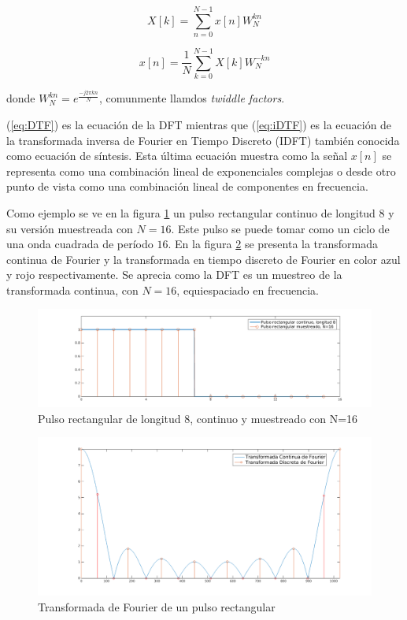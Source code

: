 \begin{equation}
X[k] = \sum_{n=0}^{N-1}x[n]W_N^{kn}
\label{eq:DTF}
\end{equation}

\begin{equation}
x[n] = \frac{1}{N}\sum_{k=0}^{N-1}X[k]W_N^{-kn}
\label{eq:iDTF}
\end{equation}

donde $W_N^{kn}=e^{\frac{-j2\pi kn}{N}}$, comunmente llamdos \textit{twiddle factors}.

(\ref{eq:DTF}) es la ecuación de la DFT mientras que (\ref{eq:iDTF}) es la ecuación de la
transformada inversa de Fourier en Tiempo Discreto (IDFT) también conocida como ecuación de síntesis. Esta última
ecuación muestra como la señal $x[n]$ se representa como una combinación lineal
de exponenciales complejas o desde otro punto de vista como una combinación
lineal de componentes en frecuencia.

Como ejemplo se ve en la figura \ref{fig:escalon_16} un pulso rectangular continuo de
longitud $8$ y su versión muestreada con $N=16$. Este pulso se puede tomar como un ciclo de una
onda cuadrada de período $16$.
En la figura \ref{fig:fourier_escalon} se presenta la transformada continua de
Fourier y la transformada en tiempo discreto de Fourier en color azul y rojo
respectivamente. Se aprecia como la DFT es un muestreo de la transformada
continua, con $N=16$, equiespaciado en frecuencia.

\begin{figure}[htb!]
        \centering
        \includegraphics[width=12cm]{./figures/pulso_rect.png}
        \caption{Pulso rectangular de longitud 8, continuo y muestreado con N=16}
        \label{fig:escalon_16}
\end{figure}

\begin{figure}[htb!]
        \centering
        \includegraphics[width=12cm]{./figures/FT_DFT.png}
        \caption{Transformada de Fourier de un pulso rectangular}
        \label{fig:fourier_escalon}
\end{figure}

